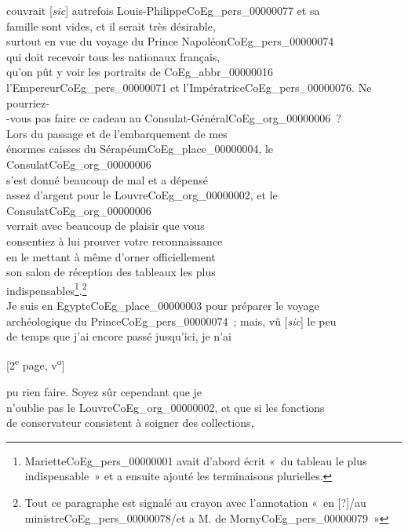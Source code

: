 \documentclass{book}
\begin{document}
couvrait {[\textit{sic}]} autrefois Louis-Philippe\gls{CoEg_pers_00000077} et sa\\
famille sont vides, et il serait très désirable,\\
surtout en vue du voyage du Prince Napoléon\gls{CoEg_pers_00000074}\\
qui doit recevoir tous les nationaux français,\\
qu’on pût y voir les portraits de \gls{CoEg_abbr_00000016}\\
l’Empereur\gls{CoEg_pers_00000071} et l’Impératrice\gls{CoEg_pers_00000076}. Ne pourriez-\\
-vous pas faire ce cadeau au Consulat-Général\gls{CoEg_org_00000006}~?\\
\indent Lors du passage et de l’embarquement de mes\\
énormes caisses du Sérapéum\gls{CoEg_place_00000004}, le Consulat\gls{CoEg_org_00000006}\\
s’est donné beaucoup de mal et a dépensé\\
assez d’argent pour le Louvre\gls{CoEg_org_00000002}, et le Consulat\gls{CoEg_org_00000006}\\
verrait avec beaucoup de plaisir que vous\\
consentiez à lui prouver votre reconnaissance\\
en le mettant à même d’orner officiellement\\
son salon de réception des tableaux les plus\\
indispensables\footnote{Mariette\gls{CoEg_pers_00000001} avait d'abord écrit «~du tableau le plus indispensable~» et a ensuite ajouté les terminaisons plurielles.}.\footnote{Tout ce paragraphe est signalé au crayon avec l'annotation «~en [?]/au ministre\gls{CoEg_pers_00000078}/et a M. de Morny\gls{CoEg_pers_00000079}~»}\\
\indent Je suis en Egypte\gls{CoEg_place_00000003} pour préparer le voyage\\
archéologique du Prince\gls{CoEg_pers_00000074}~; mais, vû {[\textit{sic}]} le peu\\
de temps que j’ai encore passé jusqu’ici, je n’ai
{\footnotesize\begin{center} {[2\textsuperscript{e} page, v\textsuperscript{o}]}\end{center}}
\noindent pu rien faire. Soyez sûr cependant que je\\
n’oublie pas le Louvre\gls{CoEg_org_00000002}, et que si les fonctions\\
de conservateur consistent à soigner des collections,\\
\end{document}
